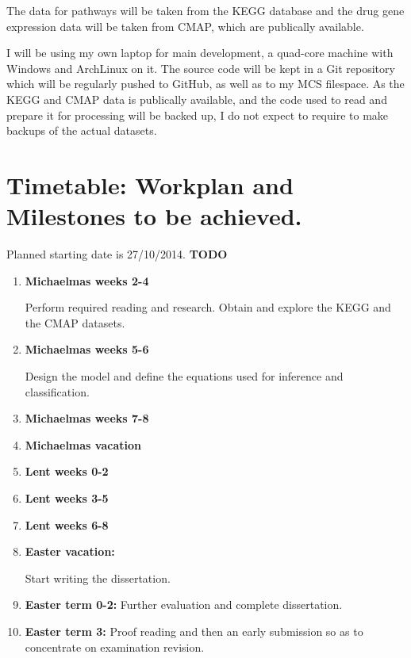 \documentclass[12pt,a4]{article}
\begin{document}
The data for pathways will be taken from the KEGG database and the drug gene expression data will be taken from CMAP, which are publically available.

I will be using my own laptop for main development, a quad-core machine with Windows and ArchLinux on it. The source code will be kept in a Git repository which will be regularly pushed to GitHub, as well as to my MCS filespace. As the KEGG and CMAP data is publically available, and the code used to read and prepare it for processing will be backed up, I do not expect to require to make backups of the actual datasets.

\section*{Timetable: Workplan and Milestones to be achieved.}

Planned starting date is 27/10/2014.
{\bf {\Large TODO}}

\begin{enumerate}

\item {\bf Michaelmas weeks 2-4} 

Perform required reading and research. Obtain and explore the KEGG and the CMAP datasets.

\item {\bf Michaelmas weeks 5-6} 

Design the model and define the equations used for inference and classification.

\item {\bf Michaelmas weeks 7-8} 
\item {\bf Michaelmas vacation} 
\item {\bf Lent weeks 0-2} 
\item {\bf Lent weeks 3-5} 
\item {\bf Lent weeks 6-8} 
\item {\bf Easter vacation:} 

Start writing the dissertation.

\item {\bf Easter term 0-2:}  Further evaluation and complete dissertation.

\item {\bf Easter term 3:} Proof reading and then an early submission so as to concentrate on examination revision.

\end{enumerate}





\end{document}
